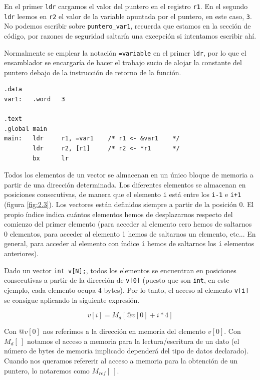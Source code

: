 En el primer {\tt ldr} cargamos el valor del puntero en el registro {\tt r1}.
En el segundo {\tt ldr} leemos en {\tt r2} el valor de la variable apuntada por el puntero,
en este caso, {\tt 3}. No podemos escribir sobre {\tt puntero\_var1}, recuerda
que estamos en la sección de código, por razones de seguridad saltaría una excepción si
intentamos escribir ahí.

Normalmente se emplear la notación {\tt =variable} en el primer {\tt ldr}, por lo que el
ensamblador se encargaría de hacer el trabajo sucio de alojar la constante del puntero
debajo de la instrucción de retorno de la función.

\begin{lstlisting}
.data
var1:   .word   3

.text
.global main
main:   ldr     r1, =var1    /* r1 <- &var1    */
        ldr     r2, [r1]     /* r2 <- *r1      */
        bx      lr
\end{lstlisting}


 Todos los elementos de un vector se almacenan en un único
bloque de memoria a partir de una dirección determinada. Los
diferentes elementos se almacenan en posiciones consecutivas, de
manera que el elemento {\tt i}  está entre los {\tt i-1} e {\tt i+1}
(figura \ref{fig:2.3}). Los
vectores están definidos siempre a partir de la posición 0. El propio
índice indica cuántos elementos hemos de desplazarnos respecto del
comienzo del primer elemento (para acceder al elemento cero hemos de
saltarnos 0 elementos, para acceder al elemento 1 hemos de saltarnos
un elemento, etc... En general, para acceder al elemento con índice
{\tt i}
hemos de saltarnos los {\tt i} elementos anteriores).

Dado un vector {\tt int v[N];}, todos los elementos se encuentran en posiciones
consecutivas a partir de la dirección de {\tt v[0]}
(puesto que son {\tt int}, en este ejemplo, cada elemento ocupa 4 bytes). Por lo tanto,
el acceso al elemento {\tt v[i]} se consigue aplicando la siguiente expresión.

\begin{equation}
v[i] = M_d[@v[0] + i*4] 
\label{eq:uno}
\end{equation}

Con $ @v[0]$ nos referimos a la dirección en memoria del elemento
 $ v[0]$. Con $ M_d[\ ]$ notamos el acceso a memoria para la lectura/escritura
de un dato (el número de bytes de memoria implicado dependerá del tipo
de datos declarado). Cuando nos queramos refererir al acceso a memoria
para la obtención de un puntero, lo notaremos como
$ M_{ref}[\ ]$.

